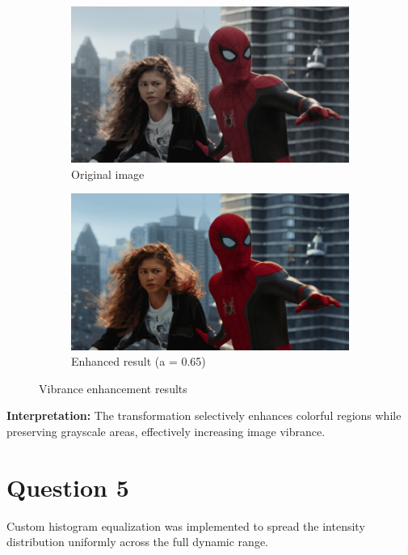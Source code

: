 \documentclass[10pt,a4paper]{article}
\begin{document}
\begin{figure}[H]
    \centering
    \begin{subfigure}{0.48\textwidth}
        \includegraphics[width=\textwidth]{task4/original.png}
        \caption{Original image}
    \end{subfigure}
    \begin{subfigure}{0.48\textwidth}
        \includegraphics[width=\textwidth]{task4/enhanced.png}
        \caption{Enhanced result (a = 0.65)}
    \end{subfigure}
    \caption{Vibrance enhancement results}
\end{figure}

\textbf{Interpretation:} The transformation selectively enhances colorful regions while preserving grayscale areas, effectively increasing image vibrance.

\section{Question 5}
Custom histogram equalization was implemented to spread the intensity distribution uniformly across the full dynamic range.
\end{document}
